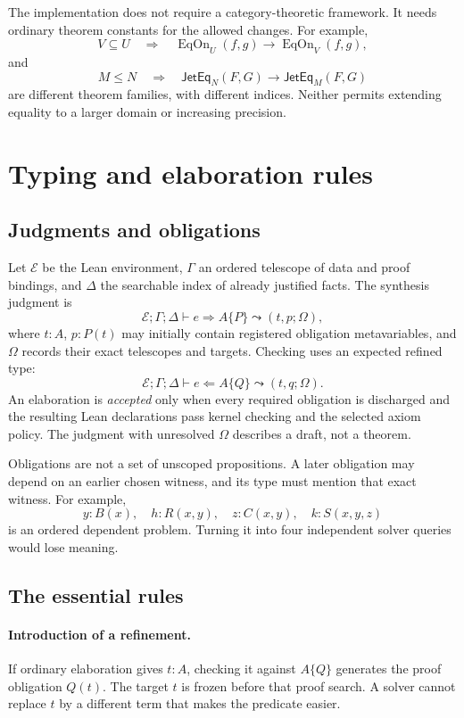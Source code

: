 \documentclass[11pt,letterpaper]{article}
\theoremstyle{definition}\newtheorem{definition}[theorem]{Definition}
\newcommand{\EqOn}{\operatorname{EqOn}}
\begin{document}
The implementation does not require a category-theoretic framework. It needs ordinary theorem constants for the allowed changes. For example,
\[
 V\subseteq U\quad\Longrightarrow\quad
 \EqOn_U(f,g)\to\EqOn_V(f,g),
\]
and
\[
 M\le N\quad\Longrightarrow\quad
 \mathsf{JetEq}_N(F,G)\to\mathsf{JetEq}_M(F,G)
\]
are different theorem families, with different indices. Neither permits extending equality to a larger domain or increasing precision.

\section{Typing and elaboration rules}\label{sec:typing}
\subsection{Judgments and obligations}
Let $\mathcal E$ be the Lean environment, $\Gamma$ an ordered telescope of data and proof bindings, and $\Delta$ the searchable index of already justified facts. The synthesis judgment is
\[
 \mathcal E;\Gamma;\Delta\vdash e\Rightarrow A\{P\}
       \leadsto(t,p;\Omega),
\]
where $t:A$, $p:P(t)$ may initially contain registered obligation metavariables, and $\Omega$ records their exact telescopes and targets. Checking uses an expected refined type:
\[
 \mathcal E;\Gamma;\Delta\vdash e\Leftarrow A\{Q\}
       \leadsto(t,q;\Omega).
\]
An elaboration is \emph{accepted} only when every required obligation is discharged and the resulting Lean declarations pass kernel checking and the selected axiom policy. The judgment with unresolved $\Omega$ describes a draft, not a theorem.

Obligations are not a set of unscoped propositions. A later obligation may depend on an earlier chosen witness, and its type must mention that exact witness. For example,
\[
 y:B(x),\quad h:R(x,y),\quad z:C(x,y),\quad k:S(x,y,z)
\]
is an ordered dependent problem. Turning it into four independent solver queries would lose meaning.

\subsection{The essential rules}
\paragraph{Introduction of a refinement.}
If ordinary elaboration gives $t:A$, checking it against $A\{Q\}$ generates the proof obligation $Q(t)$. The target $t$ is frozen before that proof search. A solver cannot replace $t$ by a different term that makes the predicate easier.
\end{document}
